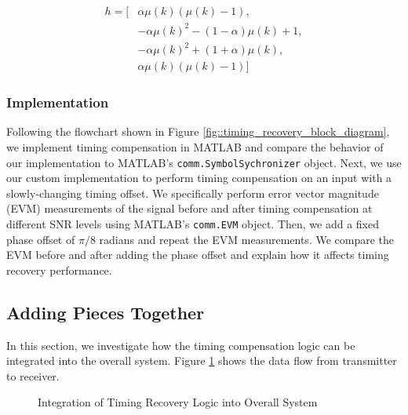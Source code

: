 \documentclass{article}
\begin{document}
\begin{equation}
\begin{split}
	h = [&\alpha\mu(k)(\mu(k) - 1), \\
	&-\alpha\mu(k)^2 - (1-\alpha)\mu(k) + 1,\\
	&-\alpha\mu(k)^2 + (1+\alpha)\mu(k),\\
	&\alpha\mu(k)(\mu(k) - 1)]
\end{split}
\end{equation}

\subsubsection{Implementation}

Following the flowchart shown in Figure \ref{fig::timing_recovery_block_diagram}, we implement timing compensation in MATLAB and compare the behavior of our implementation to MATLAB's \texttt{comm.SymbolSychronizer} object. Next, we use our custom implementation to perform timing compensation on an input with a slowly-changing timing offset. We specifically perform error vector magnitude (EVM) measurements of the signal before and after timing compensation at different SNR levels using MATLAB's \texttt{comm.EVM} object. Then, we add a fixed phase offset of $\pi/8$ radians and repeat the EVM measurements. We compare the EVM before and after adding the phase offset and explain how it affects timing recovery performance.

\subsection{Adding Pieces Together}
\label{section::sim_procedure}

In this section, we investigate how the timing compensation logic can be integrated into the overall system.  Figure \ref{fig::timing_recovery_integration} shows the data flow from transmitter to receiver.

\begin{figure}[H]
	\centerline{}
	\caption{Integration of Timing Recovery Logic into Overall System}
	\label{fig::timing_recovery_integration}
\end{figure}
\end{document}
